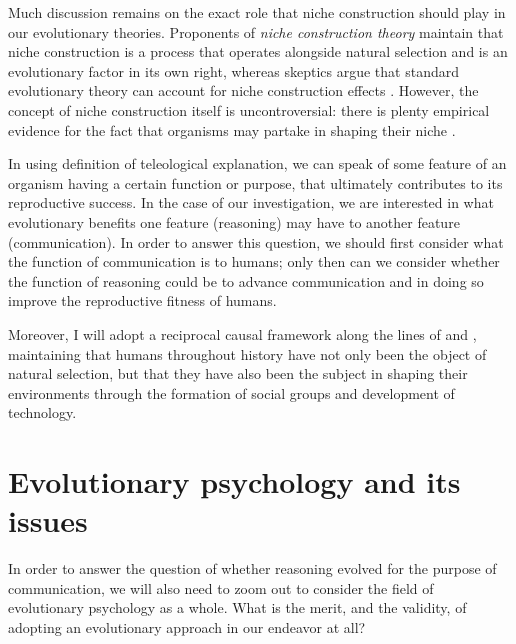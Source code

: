 Much discussion remains on the exact role that niche construction should play in our evolutionary theories. Proponents of \emph{niche construction theory} maintain that niche construction is a process that operates alongside natural selection and is an evolutionary factor in its own right, whereas skeptics argue that standard evolutionary theory can account for niche construction effects \citep{S-P13}. However, the concept of niche construction itself is uncontroversial: there is plenty empirical evidence for the fact that organisms may partake in shaping their niche \citep{S-P13}.

In using  definition of teleological explanation, we can speak of some feature of an organism having a certain function or purpose, that ultimately contributes to its reproductive success. In the case of our investigation, we are interested in what evolutionary benefits one feature (reasoning) may have to another feature (communication). In order to answer this question, we should first consider what the function of communication is to humans; only then can we consider whether the function of reasoning could be to advance communication and in doing so improve the reproductive fitness of humans.


Moreover, I will adopt a reciprocal causal framework along the lines of \citet{Laland13} and \citet{Svensson18}, maintaining that humans throughout history have not only been the object of natural selection, but that they have also been the subject in shaping their environments through the formation of social groups and development of technology.

\section{Evolutionary psychology and its issues}
\label{sec:evol-psych}
In order to answer the question of whether reasoning evolved for the purpose of communication, we will also need to zoom out to consider the field of evolutionary psychology as a whole. What is the merit, and the validity, of adopting an evolutionary approach in our endeavor at all?

